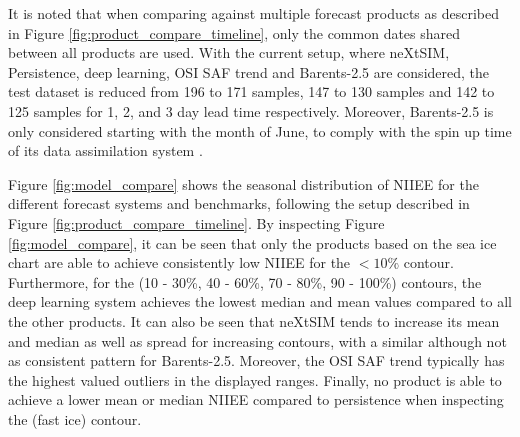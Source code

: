 \documentclass[../main/thesis.tex]{subfiles}
\begin{document}
It is noted that when comparing against multiple forecast products as described in Figure \ref{fig:product_compare_timeline}, only the common dates shared between all products are used. With the current setup, where neXtSIM, Persistence, deep learning, OSI SAF trend and Barents-2.5 are considered, the test dataset is reduced from 196 to 171 samples, 147 to 130 samples and 142 to 125 samples for 1, 2, and 3 day lead time respectively. Moreover, Barents-2.5 is only considered starting with the month of June, to comply with the spin up time of its data assimilation system \citep{Roehrs2022}.

Figure \ref{fig:model_compare} shows the seasonal distribution of NIIEE for the different forecast systems and benchmarks, following the setup described in Figure \ref{fig:product_compare_timeline}. By inspecting Figure \ref{fig:model_compare}, it can be seen that only the products based on the sea ice chart are able to achieve consistently low NIIEE for the $<10\%$ contour. Furthermore, for the (10 - 30\%, 40 - 60\%, 70 - 80\%, 90 - 100\%) contours, the deep learning system achieves the lowest median and mean values compared to all the other products. It can also be seen that neXtSIM tends to increase its mean and median as well as spread for increasing contours, with a similar although not as consistent pattern for Barents-2.5. Moreover, the OSI SAF trend typically has the highest valued outliers in the displayed ranges. Finally, no product is able to achieve a lower mean or median NIIEE compared to persistence when inspecting the (fast ice) contour. 
\end{document}
